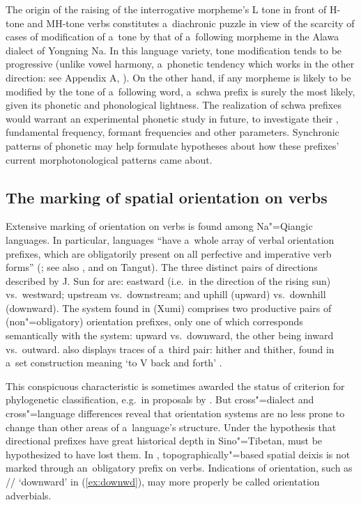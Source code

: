 \newpage 
The origin of the raising of the interrogative morpheme's L tone in front of H-tone and MH-tone verbs constitutes a~{diachronic} puzzle in view of the scarcity of cases of modification of a~tone by that of a~following morpheme in the Alawa dialect of Yongning Na. In this language variety, tone modification tends to be progressive (unlike vowel harmony, a~phonetic tendency which works in the other direction: see Appendix A, ). On the other hand, if any morpheme is likely to be modified by the tone of a~following word, a~schwa prefix is surely the most likely, given its phonetic and phonological lightness. The realization of schwa prefixes would warrant an experimental phonetic study in future, to investigate their , fundamental frequency, formant frequencies and other parameters. Synchronic patterns of phonetic  may help formulate hypotheses about how these prefixes' current morphotonological patterns came about.


\subsection{The marking of spatial orientation on verbs}
\label{sec:themarkingofspatialorientationonverbs}

Extensive marking of orientation on verbs is found among Na"=Qiangic languages. In particular,  languages “have a~whole array of verbal orientation prefixes, which are
obligatorily present on all perfective and {imperative} verb forms” (\citealt[180]{sun2000a}; see also \citealt{lin2002},
and \citealt{jacques2011b} on Tangut). The three distinct pairs of directions described by J. Sun for  are: eastward (i.e.\ in the
direction of the rising sun) vs.\ westward; upstream vs.\ downstream; and uphill (upward) vs.\ downhill
(downward). The system found in  (Xumi) comprises two productive pairs of (non"=obligatory)
orientation prefixes, only one of which corresponds semantically with the  system: upward
vs.\ downward, the other being inward vs.\ outward.  also displays traces of a~third pair:
hither and thither, found in a~set construction meaning ‘to V back and forth’
\citep{chirkova2009}.

This conspicuous characteristic is sometimes awarded the status of criterion for phylogenetic classification, e.g.~in
proposals by \citet[105]{matisoff2004}. But cross"=dialect and cross"=language differences reveal that
orientation systems are no less prone to change than other areas of a~language’s structure. Under the hypothesis that directional prefixes have great historical depth in Sino"=Tibetan,
 must be hypothesized to have lost them. In , topographically"=based spatial
deixis is not marked through an~obligatory prefix on verbs. Indications of orientation, such as // ‘downward’ in (\ref{ex:downwd}), may more
properly be called orientation adverbials.
\newpage 

